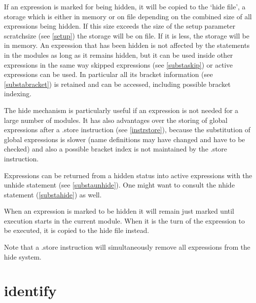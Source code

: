 \noindent If an expression is marked for being hidden, it will be copied to 
the `hide file', a storage which is 
either in memory or on file depending on the combined size of all 
expressions being hidden. If this size exceeds the size of the setup 
parameter scratchsize (see \ref{setup}) the storage will 
be on file. If it is less, the storage will be in memory. An expression 
that has been hidden is not affected by the statements in the modules as 
long as it remains hidden, but it can be used inside other expressions in 
the same way skipped expressions (see 
\ref{substaskip}) or active expressions can be used. In particular all its 
bracket information (see \ref{substabracket}) is retained 
and can be accessed, including possible bracket 
indexing. \vspace{4mm}

\noindent The hide mechanism is particularly useful if an expression is not 
needed for a large number of modules. It has also advantages over the 
storing of global expressions after a .store instruction (see 
\ref{instrstore}), because the substitution of global expressions is slower 
(name definitions may have changed and have to be checked) and also a 
possible bracket index is not maintained by the .store instruction. 
\vspace{4mm}

\noindent Expressions can be returned from a hidden status into active 
expressions with the unhide statement (see 
\ref{substaunhide}). One might want to consult the nhide 
statement (\ref{substahide}) as well. \vspace{4mm}

\noindent When an expression is marked to be hidden it will remain just 
marked until execution starts in the current module. When it is the turn of 
the expression to be executed, it is copied to the hide file instead. 
\vspace{4mm}

\noindent Note that a .store instruction will simultaneously remove all 
expressions from the hide system. \vspace{10mm}


\section{identify}
\label{substaidentify}

